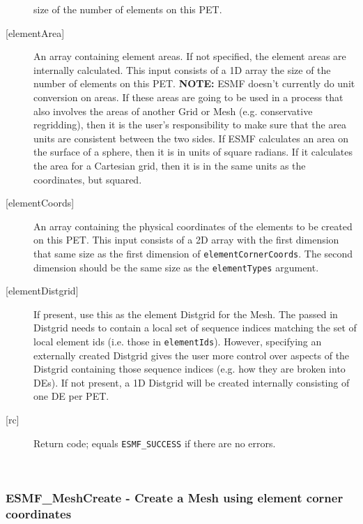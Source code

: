 \begin{description}
            size of the number of elements on this PET.
     \item [{[elementArea]}]
            An array containing element areas. If not specified, the element areas are internally calculated.
            This input consists of a 1D array the size of the number of elements on this PET.
            {\bf NOTE:} ESMF doesn't currently do unit conversion on areas. If these areas are going to be used
                  in a process that also involves the areas of another Grid or Mesh (e.g. conservative regridding), then
                  it is the user's responsibility to make sure that the area units are consistent between the two sides.
                  If ESMF calculates an area on the surface of a sphere, then it is in units of square radians. If
                  it calculates the area for a Cartesian grid, then it is in the same units as the coordinates, but squared.
     \item[{[elementCoords]}]
            An array containing the physical coordinates of the elements to be created on this
            PET. This input consists of a 2D array with the first dimension that same size as the first dimension of {\tt elementCornerCoords}.
            The second dimension should be the same size as the {\tt elementTypes} argument.
     \item [{[elementDistgrid]}]
            If present, use this as the element Distgrid for the Mesh.
            The passed in Distgrid
            needs to contain a local set of sequence indices matching the set of local element ids (i.e. those in {\tt elementIds}).
            However, specifying an externally created Distgrid gives the user more control over aspects of
            the Distgrid containing those sequence indices (e.g. how they are broken into DEs).
            If not present, a 1D Distgrid will be created internally consisting of one DE per PET.
     \item [{[rc]}]
           Return code; equals {\tt ESMF\_SUCCESS} if there are no errors.
     \end{description}
   
 
\mbox{}\hrulefill\ 
 
\subsubsection [ESMF\_MeshCreate] {ESMF\_MeshCreate - Create a Mesh using element corner coordinates}


